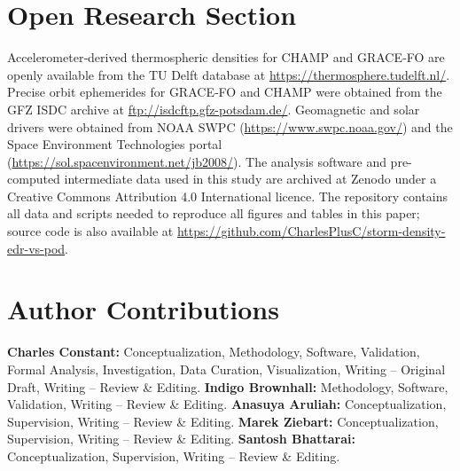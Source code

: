 \documentclass{agujournal2019}
\begin{document}




%
%

\section*{Open Research Section}
Accelerometer‐derived thermospheric densities for CHAMP and GRACE‐FO are openly available from the TU Delft database \cite{Siemes2023NewGRACE-FO} at \url{https://thermosphere.tudelft.nl/}.
Precise orbit ephemerides for GRACE‐FO and CHAMP were obtained from the GFZ ISDC archive \cite{Schreiner2022GFZProducts} at \url{ftp://isdcftp.gfz-potsdam.de/}.
Geomagnetic and solar drivers were obtained from NOAA SWPC (\url{https://www.swpc.noaa.gov/})
and the Space Environment Technologies portal (\url{https://sol.spacenvironment.net/jb2008/}).
The analysis software and pre-computed intermediate data used in this study are archived at Zenodo \cite{Constant2026Software} under a Creative Commons Attribution 4.0 International licence. The repository contains all data and scripts needed to reproduce all figures and tables in this paper; source code is also available at \url{https://github.com/CharlesPlusC/storm-density-edr-vs-pod}.

\section*{Author Contributions}
\textbf{Charles Constant:} Conceptualization, Methodology, Software, Validation, Formal Analysis, Investigation, Data Curation, Visualization, Writing -- Original Draft, Writing -- Review \& Editing.
\textbf{Indigo Brownhall:} Methodology, Software, Validation, Writing -- Review \& Editing.
\textbf{Anasuya Aruliah:} Conceptualization, Supervision, Writing -- Review \& Editing.
\textbf{Marek Ziebart:} Conceptualization, Supervision, Writing -- Review \& Editing.
\textbf{Santosh Bhattarai:} Conceptualization, Supervision, Writing -- Review \& Editing.
\end{document}
